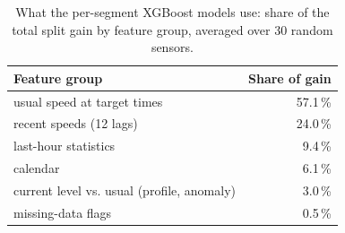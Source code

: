 \begin{table}[H]
\centering
\caption{What the per-segment XGBoost models use: share of the total split gain by feature group, averaged over 30 random sensors.}
\label{tab:xgbgroups}
\small
\begin{tabular}{lr}
\toprule
Feature group & Share of gain \\
\midrule
usual speed at target times & 57.1\,\% \\
recent speeds (12 lags) & 24.0\,\% \\
last-hour statistics & 9.4\,\% \\
calendar & 6.1\,\% \\
current level vs. usual (profile, anomaly) & 3.0\,\% \\
missing-data flags & 0.5\,\% \\
\bottomrule
\end{tabular}
\end{table}